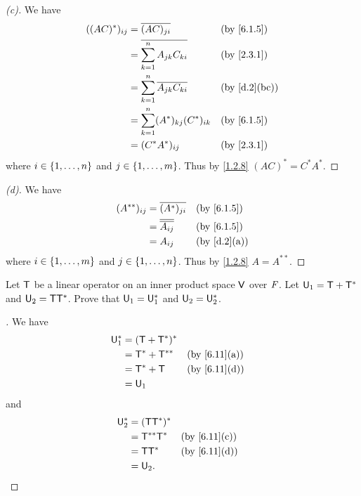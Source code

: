 \begin{proof}[(c)]
	We have
	\begin{align*}
		((AC)^*)_{i j} & = \conj{(AC)_{j i}}                            &  & \by{6.1.5}   \\
		               & = \conj{\sum_{k = 1}^n A_{j k} C_{k i}}        &  & \by{2.3.1}   \\
		               & = \sum_{k = 1}^n \conj{A_{j k}} \conj{C_{k i}} &  & \by{d.2}[bc] \\
		               & = \sum_{k = 1}^n (A^*)_{k j} (C^*)_{i k}       &  & \by{6.1.5}   \\
		               & = (C^* A^*)_{i j}                              &  & \by{2.3.1}
	\end{align*}
	where \(i \in \left\lbrace1, \dots, n\right\rbrace\) and \(j \in \left\lbrace1, \dots, m\right\rbrace\).
	Thus by \cref{1.2.8} \((AC)^* = C^* A^*\).
\end{proof}

\begin{proof}[(d)]
	We have
	\begin{align*}
		(A^{**})_{i j} & = \conj{(A^*)_{j i}}    &  & \by{6.1.5}  \\
		               & = \conj{\conj{A_{i j}}} &  & \by{6.1.5}  \\
		               & = A_{i j}               &  & \by{d.2}[a]
	\end{align*}
	where \(i \in \left\lbrace1, \dots, m\right\rbrace\) and \(j \in \left\lbrace1, \dots, n\right\rbrace\).
	Thus by \cref{1.2.8} \(A = A^{**}\).
\end{proof}

\begin{ex}\label{ex:6.3.6}
	Let \(\mathsf{T}\) be a linear operator on an inner product space \(\mathsf{V}\) over \(\mathit{F}\).
	Let \(\mathsf{U}_1 = \mathsf{T} + \mathsf{T}^*\) and \(\mathsf{U}_2 = \mathsf{T} \mathsf{T}^*\).
	Prove that \(\mathsf{U}_1 = \mathsf{U}_1^*\) and \(\mathsf{U}_2 = \mathsf{U}_2^*\).
\end{ex}

\begin{proof}[]
	We have
	\begin{align*}
		\U_1^* & = (\T + \T^*)^*                    \\
		       & = \T^* + \T^{**} &  & \by{6.11}[a] \\
		       & = \T^* + \T      &  & \by{6.11}[d] \\
		       & = \U_1
	\end{align*}
	and
	\begin{align*}
		\U_2^* & = (\T \T^*)^*                    \\
		       & = \T^{**} \T^* &  & \by{6.11}[c] \\
		       & = \T \T^*      &  & \by{6.11}[d] \\
		       & = \U_2.
	\end{align*}
\end{proof}

